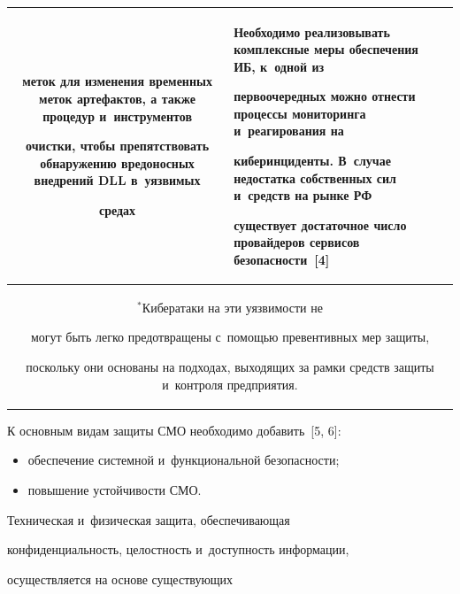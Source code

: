 \begin{table}
\begin{center}
\begin{tabular}{|c|p{70mm}|p{46mm}|}
\begin{itemize}
меток для изменения временных меток артефактов, а также процедур и~инструментов 

очистки, чтобы препятствовать обнаружению вредоносных внедрений DLL в~уязвимых 

средах\vspace*{-6pt}

\end{itemize}&Необходимо реализовывать комплексные меры обеспечения ИБ, к~одной из 

первоочередных можно отнести процессы мониторинга и~реагирования на 

киберинциденты. В~случае недостатка собственных сил и~средств на рынке РФ 

существует достаточное число провайдеров сервисов безопас\-ности~[4]\\

\hline

\multicolumn{3}{p{128mm}}{\footnotesize \hspace*{3mm}$^{*}$Кибератаки на эти уязвимости не 

могут быть легко предотвращены с~помощью превентивных мер защиты, 

поскольку они основаны на подходах, выходящих за рамки средств защиты и~контроля предприятия.}

\end{tabular}

\end{center}

\vspace*{-12pt}

\end{table}



К основным видам защиты СМО необходимо добавить~[5, 6]:

\begin{itemize}

\item обеспечение системной и~функциональной безопас\-ности;

\item повышение устойчивости СМО.

\end{itemize}

     

     Техническая и~физическая защита, обеспечивающая 

конфиденциальность, целостность и~доступность информации, 

осуществляется на основе существующих  

